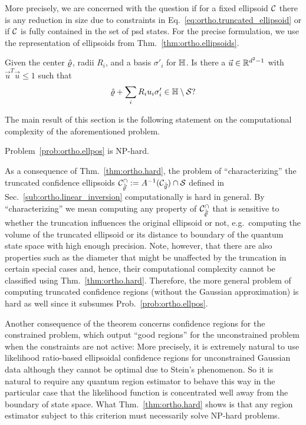 More precisely, we are concerned with the question if for a fixed ellipsoid $\mathcal{C}$ there is any reduction in size due to constraints in Eq.~\eqref{eq:ortho.truncated_ellipsoid} or if $\mathcal{C}$ is fully contained in the set of psd states.
For the precise formulation, we use the representation of ellipsoids from Thm.~\ref{thm:ortho.ellipsoids}.
\begin{problem}\label{prob:ortho.ellpos}
  Given the center $\hat{\varrho}$, radii $R_i$, and a basis $\sigma'_i$ for $\mathbb{H}$.
  Is there a $\vec u \in \mathbb{R}^{d^2 - 1}$ with $\vec{u}^{T}\vec{u} \leq 1$ such that
  \begin{equation}
    \hat{\varrho} + \sum_{i}R_{i}u_{i}\sigma_{i}' \in \mathbb{H} \setminus \mathcal{S}?
  \end{equation}
\end{problem}
The main result of this section is the following statement on the computational complexity of the aforementioned problem.
\begin{theorem}\label{thm:ortho.hard}
  Problem~\ref{prob:ortho.ellpos} is NP-hard.
\end{theorem}
As a consequence of Thm.~\ref{thm:ortho.hard}, the problem of ``characterizing'' the truncated confidence ellipsoids $\mathcal{C}_{\hat{\vec \varrho}}^\cap := A^{-1}(\mathcal{C}_{\hat{\vec y}}) \cap \mathcal{S}$ defined in Sec.~\ref{sub:ortho.linear_inversion} computationally is hard in general.
By ``characterizing'' we mean computing any property of $\mathcal{C}_{\hat{\vec \varrho}}^\cap$ that is sensitive to whether the truncation influences the original ellipsoid or not, e.g.\ computing the volume of the truncated ellipsoid or its distance to boundary of the quantum state space with high enough precision.
Note, however, that there are also properties such as the diameter that might be unaffected by the truncation in certain special cases and, hence, their computational complexity cannot be classified using Thm.~\ref{thm:ortho.hard}.
Therefore, the more general problem of computing truncated confidence regions (without the Gaussian approximation) is hard as well since it subsumes Prob.~\ref{prob:ortho.ellpos}.

Another consequence of the theorem concerns confidence regions for the constrained problem, which output ``good regions'' for the unconstrained problem when the constraints are not active:
More precisely, it is extremely natural to use likelihood ratio-based ellipsoidal confidence regions for unconstrained Gaussian data although they cannot be optimal due to Stein's phenomenon.
So it is natural to require any quantum region estimator to behave this way in the particular case that the likelihood function is concentrated well away from the boundary of state space.
What Thm.~\ref{thm:ortho.hard} shows is that any region estimator subject to this criterion must necessarily solve NP-hard problems.\\


